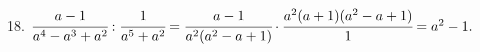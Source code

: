 18. $\cfrac{a-1}{a^4-a^3+a^2}: \cfrac{1}{a^5+a^2}=\cfrac{a-1}{a^2(a^2-a+1)}\cdot\cfrac{a^2(a+1)(a^2-a+1)}{1}=a^2-1.$\\
